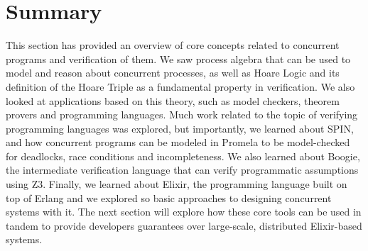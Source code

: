 \section{Summary}
This section has provided an overview of core concepts related to concurrent programs and verification of them. We saw process algebra that can be used to model and reason about concurrent processes, as well as Hoare Logic and its definition of the Hoare Triple as a fundamental property in verification. We also looked at applications based on this theory, such as model checkers, theorem provers and programming languages. Much work related to the topic of verifying programming languages was explored, but importantly, we learned about SPIN, and how concurrent programs can be modeled in Promela to be model-checked for deadlocks, race conditions and incompleteness. We also learned about Boogie, the intermediate verification language that can verify programmatic assumptions using Z3. Finally, we learned about Elixir, the programming language built on top of Erlang and we explored so basic approaches to designing concurrent systems with it. The next section will explore how these core tools can be used in tandem to provide developers guarantees over large-scale, distributed Elixir-based systems.

